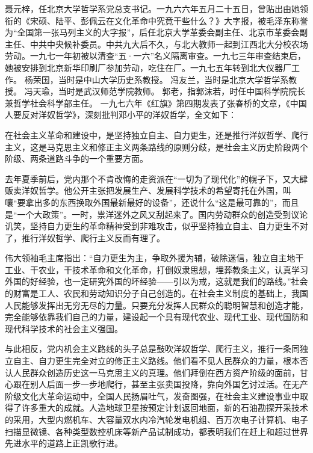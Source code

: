 \begin{maonote}
聂元梓，任北京大学哲学系党总支书记。一九六六年五月二十五日，曾贴出由她领衔的《宋硕、陆平、彭佩云在文化革命中究竟干些什么？》大字报，被毛泽东称誉为“全国第一张马列主义的大字报”，后任北京大学革委会副主任、北京市革委会副主任、中共中央候补委员。中共九大后不久，与北大教师一起到江西北大分校农场劳动。一九七一年初被以清查“五·一六”名义隔离审查。一九七三年审查结束后，她被安排到北京新华印刷厂参加劳动，吃住在厂。一九七五年转到北大仪器厂工作。
杨荣国，当时是中山大学历史系教授。
冯友兰，当时是北京大学哲学系教授。
冯天瑜，当时是武汉师范学院教师。
郭老，指郭沫若，时任中国科学院院长兼哲学社会科学部主任。
一九七六年《红旗》第四期发表了张春桥的文章，《中国人要反对洋奴哲学》，深刻批判邓小平的洋奴哲学，全文如下：

在社会主义革命和建设中，是坚持独立自主、自力更生，还是推行洋奴哲学、爬行主义，这是马克思主义和修正主义两条路线的原则分歧，是社会主义历史阶段两个阶级、两条道路斗争的一个重要方面。

去年夏季前后，党内那个不肯改悔的走资派在“一切为了现代化”的幌子下，又大肆贩卖洋奴哲学。他公开主张把发展生产、发展科学技术的希望寄托在外国，叫嚷“要拿出多的东西换取外国最新最好的设备”，还说什么“这是最可靠的”，而且是“一个大政策”。一时，祟洋迷外之风又刮起来了。国内劳动群众的创造受到议论讥笑，坚持自力更生的革命精神受到非难攻击，似乎坚持独立自主、自力更生不对了，推行洋奴哲学、爬行主义反而有理了。

伟大领袖毛主席指出：“自力更生为主，争取外援为辅，破除迷信，独立自主地干工业、干农业，干技术革命和文化革命，打倒奴隶思想，埋葬教条主义，认真学习外国的好经验，也一定研究外国的坏经验——引以为戒，这就是我们的路线。”社会的财富是工人、农民和劳动知识分子自己创造的。在社会主义制度的基础上，我国人民能够发挥出无穷无尽的力量。只要充分发挥人民群众的聪明智慧和创造才能，完全能够依靠我们自己的力量，建设起一个具有现代农业、现代工业、现代国防和现代科学技术的社会主义强国。

与此相反，党内机会主义路线的头子总是鼓吹洋奴哲学、爬行主义，推行一条同独立自主、自力更生完全对立的修正主义路线。他们看不见人民群众的力量，根本否认人民群众创造历史这一马克思主义的真理。他们拜倒在西方资产阶级的面前，甘心跟在别人后面一步一步地爬行，甚至主张卖国投降，靠向外国乞讨过活。在无产阶级文化大革命运动中，全国人民扬眉吐气，发奋图强，在社会主义建设事业中取得了许多重大的成就。人造地球卫星按预定计划返回地面，新的石油勘探开采技术的采用，大型内燃机车、大容量双水内冷汽轮发电机组、百万次电子计算机、电子扫描显微镜、各种类型数控机床等新产品试制成功，都表明我们在赶上和超过世界先进水平的道路上正凯歌行进。


\end{maonote}
